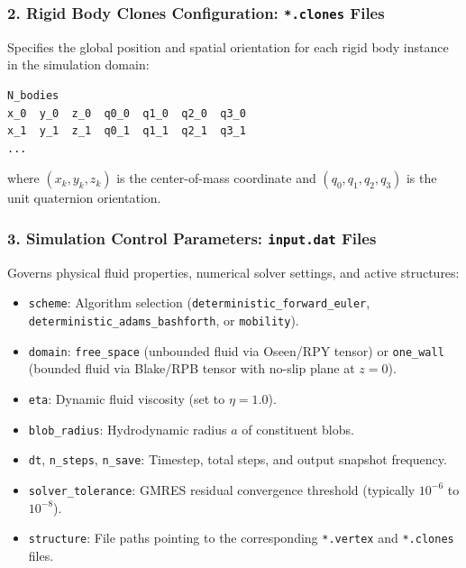 \documentclass[11pt,a4paper]{article}
\begin{document}
\subsubsection{2. Rigid Body Clones Configuration: \texttt{*.clones} Files}
Specifies the global position and spatial orientation for each rigid body instance in the simulation domain:
\begin{verbatim}
N_bodies
x_0  y_0  z_0  q0_0  q1_0  q2_0  q3_0
x_1  y_1  z_1  q0_1  q1_1  q2_1  q3_1
...
\end{verbatim}
where $(x_k, y_k, z_k)$ is the center-of-mass coordinate and $(q_0, q_1, q_2, q_3)$ is the unit quaternion orientation.

\subsubsection{3. Simulation Control Parameters: \texttt{input.dat} Files}
Governs physical fluid properties, numerical solver settings, and active structures:
\begin{itemize}
    \item \texttt{scheme}: Algorithm selection (\texttt{deterministic\_forward\_euler}, \texttt{deterministic\_adams\_bashforth}, or \texttt{mobility}).
    \item \texttt{domain}: \texttt{free\_space} (unbounded fluid via Oseen/RPY tensor) or \texttt{one\_wall} (bounded fluid via Blake/RPB tensor with no-slip plane at $z = 0$).
    \item \texttt{eta}: Dynamic fluid viscosity (set to $\eta = 1.0$).
    \item \texttt{blob\_radius}: Hydrodynamic radius $a$ of constituent blobs.
    \item \texttt{dt}, \texttt{n\_steps}, \texttt{n\_save}: Timestep, total steps, and output snapshot frequency.
    \item \texttt{solver\_tolerance}: GMRES residual convergence threshold (typically $10^{-6}$ to $10^{-8}$).
    \item \texttt{structure}: File paths pointing to the corresponding \texttt{*.vertex} and \texttt{*.clones} files.
\end{itemize}
\end{document}
